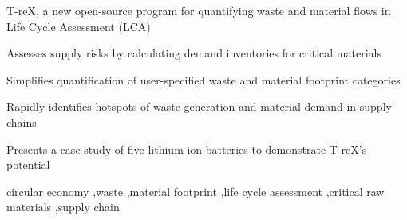 \documentclass[a4paper,fleqn]{cas-dc}
\begin{document}
\begin{highlights}
	\item T-reX, a new open-source program for quantifying waste and material flows in
	Life Cycle Assessment (LCA)
	\item Assesses supply risks by calculating demand inventories for critical materials
	\item Simplifies quantification of user-specified waste and material footprint
	categories
	\item Rapidly identifies hotspots of waste generation and material demand in supply
	chains
	\item Presents a case study of five lithium-ion batteries to demonstrate T-reX's
	potential
\end{highlights}

\begin{keywords}
	circular economy \sep waste \sep material footprint \sep life cycle assessment \sep critical raw materials \sep supply chain
\end{keywords}


\maketitle

\end{document}
